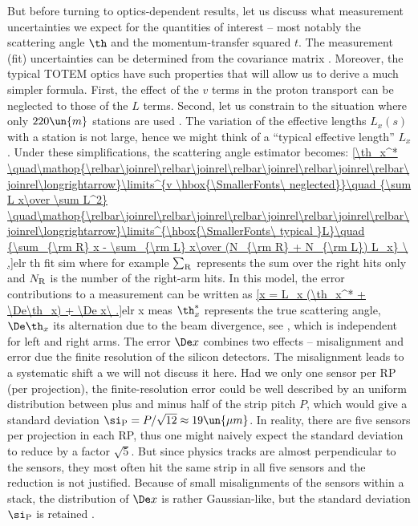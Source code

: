 But before turning to optics-dependent results, let us discuss what measurement uncertainties we expect for the quantities of interest -- most notably the scattering angle $\th$ and the momentum-transfer squared $t$. The measurement (fit) uncertainties can be determined from the covariance matrix . Moreover, the typical TOTEM optics  have such properties that will allow us to derive a much simpler formula. First, the effect of the $v$ terms in the proton transport  can be neglected to those of the $L$ terms. Second, let us constrain to the situation where only $220\un{m}$ stations are used . The variation of the effective lengths $L_x(s)$ with a station is not large, hence we might think of a ``typical effective length'' $L_x$. Under these simplifications, the scattering angle estimator becomes:
\eqref{\th_x^*
	\quad\mathop{\relbar\joinrel\relbar\joinrel\relbar\joinrel\relbar\joinrel\relbar\joinrel\longrightarrow}\limits^{v \hbox{\SmallerFonts\ neglected}}\quad
		{\sum L x\over \sum L^2}
	\quad\mathop{\relbar\joinrel\relbar\joinrel\relbar\joinrel\relbar\joinrel\relbar\joinrel\longrightarrow}\limits^{\hbox{\SmallerFonts\ typical }L}\quad
	{\sum_{\rm R} x - \sum_{\rm L} x\over (N_{\rm R} + N_{\rm L}) L_x}
\ ,}{elr th fit sim} 
where for example $\sum_{\rm R}$ represents the sum over the right hits only and $N_{\rm R}$ is the number of the right-arm hits. In this model, the error contributions to a measurement can be written as
\eqref{x = L_x (\th_x^* + \De\th_x) + \De x\ .}{elr x meas}
$\th_x^*$ represents the true scattering angle, $\De\th_x$ its alternation due to the beam divergence, see , which is independent for left and right arms. The error $\De x$ combines two effects -- misalignment and error due the finite resolution of the silicon detectors. The misalignment leads to a systematic shift a we will not discuss it here. Had we only one sensor per RP (per projection), the finite-resolution error could be well described by an uniform distribution between plus and minus half of the strip pitch $P$, which would give a standard deviation $\si_{\rm P} = P/\sqrt{12}\approx 19\un{\mu m}$. In reality, there are five sensors per projection in each RP, thus one might naively expect the standard deviation to reduce by a factor $\sqrt 5$. But since physics tracks are almost perpendicular to the sensors, they most often hit the same strip in all five sensors and the reduction is not justified. Because of small misalignments of the sensors within a stack, the distribution of $\De x$ is rather Gaussian-like, but the standard deviation $\si_{\rm P}$ is retained .

